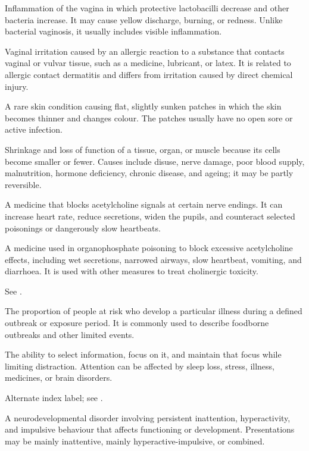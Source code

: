  Inflammation of the vagina in which protective lactobacilli decrease and other bacteria increase. It may cause yellow discharge, burning, or redness. Unlike bacterial vaginosis, it usually includes visible inflammation.

 Vaginal irritation caused by an allergic reaction to a substance that contacts vaginal or vulvar tissue, such as a medicine, lubricant, or latex. It is related to allergic contact dermatitis and differs from irritation caused by direct chemical injury.

 A rare skin condition causing flat, slightly sunken patches in which the skin becomes thinner and changes colour. The patches usually have no open sore or active infection.

 Shrinkage and loss of function of a tissue, organ, or muscle because its cells become smaller or fewer. Causes include disuse, nerve damage, poor blood supply, malnutrition, hormone deficiency, chronic disease, and ageing; it may be partly reversible.

 A medicine that blocks acetylcholine signals at certain nerve endings. It can increase heart rate, reduce secretions, widen the pupils, and counteract selected poisonings or dangerously slow heartbeats.

 A medicine used in organophosphate poisoning to block excessive acetylcholine effects, including wet secretions, narrowed airways, slow heartbeat, vomiting, and diarrhoea. It is used with other measures to treat cholinergic toxicity.

 See .

 The proportion of people at risk who develop a particular illness during a defined outbreak or exposure period. It is commonly used to describe foodborne outbreaks and other limited events.

 The ability to select information, focus on it, and maintain that focus while limiting distraction. Attention can be affected by sleep loss, stress, illness, medicines, or brain disorders.

 Alternate index label; see .

 A neurodevelopmental disorder involving persistent inattention, hyperactivity, and impulsive behaviour that affects functioning or development. Presentations may be mainly inattentive, mainly hyperactive-impulsive, or combined.

